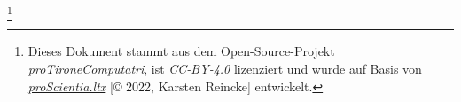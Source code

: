 %
\footnote{Dieses Dokument stammt aus dem Open-Source-Projekt
\textit{\href{https://github.com/kreincke/proTironeComputatri}{proTironeComputatri}},
ist \textit{\href{https://creativecommons.org/licenses/by/4.0/}{CC-BY-4.0}} lizenziert 
und wurde auf Basis von \textit{\href{https://github.com/kreincke/proScientia.ltx}{proScientia.ltx}} 
[\copyright{} 2022, Karsten Reincke] entwickelt.}
